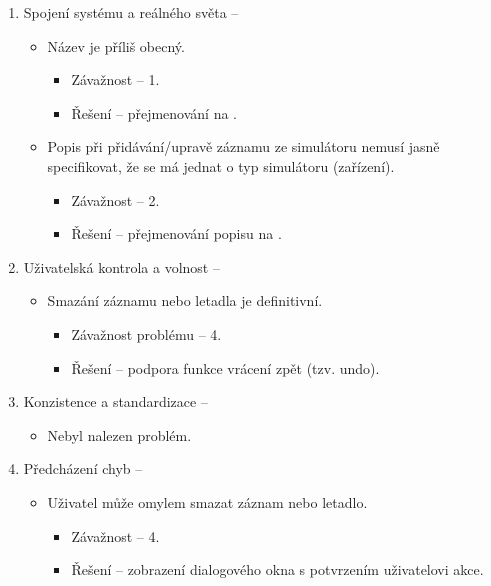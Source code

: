 \documentclass[thesis=M,czech]{FITthesis}[2012/06/26]
\begin{document}
\begin{enumerate}
\item Spojení systému a reálného světa -- 
\begin{itemize}
 	\item Název  je příliš obecný.
 	\begin{itemize}
 		\item Závažnost -- 1.
 		\item Řešení -- přejmenování  na .
 	\end{itemize}
 	\item Popis  při přidávání/upravě záznamu ze simulátoru nemusí jasně specifikovat, že se má jednat o typ simulátoru (zařízení).
 	\begin{itemize}
 		\item Závažnost -- 2.
 		\item Řešení -- přejmenování popisu  na .
 	\end{itemize}
\end{itemize}
 
 
\item Uživatelská kontrola a volnost -- 
\begin{itemize}
	\item Smazání záznamu nebo letadla je definitivní.
	\begin{itemize}
		\item Závažnost problému -- 4.
		\item Řešení -- podpora funkce vrácení zpět (tzv. undo).
	\end{itemize}
\end{itemize}
 
\item Konzistence a standardizace -- 
\begin{itemize}
 	\item Nebyl nalezen problém.
\end{itemize}
 
\item Předcházení chyb -- 
\begin{itemize}
 	\item Uživatel může omylem smazat záznam nebo letadlo.
 	\begin{itemize}
 		\item Závažnost -- 4.
 		\item Řešení -- zobrazení dialogového okna s potvrzením uživatelovi akce.
 	\end{itemize}
\end{itemize}
 

\end{enumerate}
\end{document}
